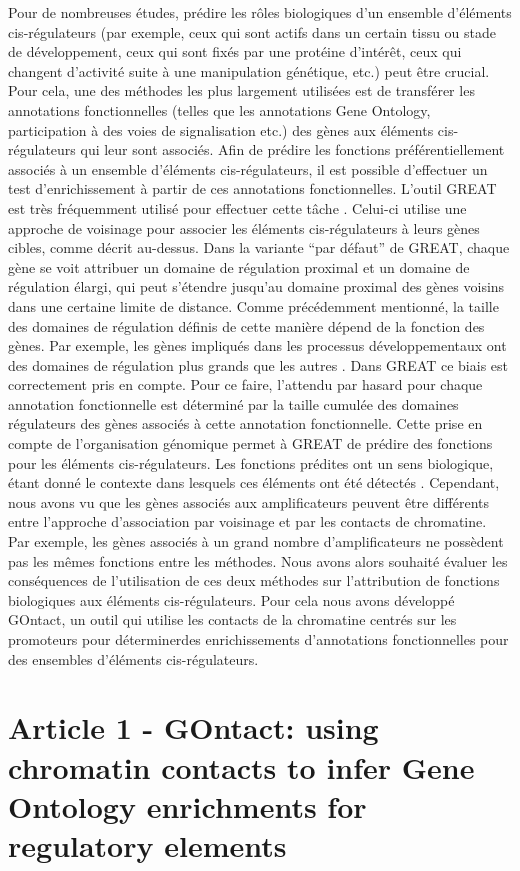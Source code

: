 Pour de nombreuses études, prédire les rôles biologiques d’un ensemble d’éléments \gls{cis}-régulateurs (par exemple, ceux qui sont actifs dans un certain tissu ou stade de développement, ceux qui sont fixés par une protéine d’intérêt, ceux qui changent d’activité suite à une manipulation génétique, etc.) peut être crucial. Pour cela, une des méthodes les plus largement utilisées est de transférer les annotations fonctionnelles (telles que les annotations Gene Ontology, participation à des voies de signalisation etc.) des gènes aux éléments \gls{cis}-régulateurs qui leur sont associés. Afin de prédire les fonctions préférentiellement associés à un ensemble d’éléments \gls{cis}-régulateurs, il est possible d’effectuer un test d’enrichissement à partir de ces annotations fonctionnelles. L’outil GREAT est très fréquemment utilisé pour effectuer cette tâche \citep{mclean_great_2010}. Celui-ci utilise une approche de voisinage pour associer les éléments \gls{cis}-régulateurs à leurs gènes cibles, comme décrit au-dessus. Dans la variante “par défaut” de GREAT, chaque gène se voit attribuer un domaine de régulation proximal et un domaine de régulation élargi, qui peut s’étendre jusqu’au domaine proximal des gènes voisins dans une certaine limite de distance. Comme précédemment mentionné, la taille des domaines de régulation définis de cette manière dépend de la fonction des gènes. Par exemple, les gènes impliqués dans les processus développementaux ont des domaines de régulation plus grands que les autres \citep{mclean_great_2010}. Dans GREAT ce biais est correctement pris en compte. Pour ce faire, l’attendu par hasard pour chaque annotation fonctionnelle est déterminé par la taille cumulée des domaines régulateurs des gènes associés à cette annotation fonctionnelle. Cette prise en compte de l’organisation génomique permet à GREAT de prédire des fonctions pour les éléments \gls{cis}-régulateurs. Les fonctions prédites ont un sens biologique, étant donné le contexte dans lesquels ces éléments ont été détectés \citep{mclean_great_2010, rada-iglesias_unique_2011}. Cependant, nous avons vu que les gènes associés aux amplificateurs peuvent être différents entre l’approche d’association par voisinage et par les contacts de chromatine. Par exemple, les gènes associés à un grand nombre d’amplificateurs ne possèdent pas les mêmes fonctions entre les méthodes. Nous avons alors souhaité évaluer les conséquences de l’utilisation de ces deux méthodes sur l’attribution de fonctions biologiques aux éléments \gls{cis}-régulateurs. Pour cela nous avons développé GOntact, un outil qui utilise les contacts de la chromatine centrés sur les promoteurs pour déterminerdes enrichissements d’annotations fonctionnelles  pour des ensembles d’éléments \gls{cis}-régulateurs.


\chapter{Article 1 - GOntact: using chromatin contacts to infer Gene Ontology enrichments for regulatory elements}
%